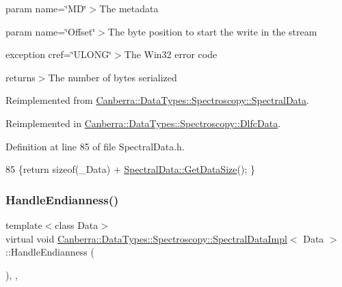 param name=\char`\"{}\+M\+D\char`\"{}$>$The metadata

param name=\char`\"{}\+Offset\char`\"{}$>$The byte position to start the write in the stream

exception cref=\char`\"{}\+U\+L\+O\+N\+G\char`\"{}$>$The Win32 error code

returns$>$The number of bytes serialized

Reimplemented from \hyperlink{class_canberra_1_1_data_types_1_1_spectroscopy_1_1_spectral_data_ac95bb6b9dd1b89c6c85b9a8afccd5d20_ac95bb6b9dd1b89c6c85b9a8afccd5d20}{Canberra\+::\+Data\+Types\+::\+Spectroscopy\+::\+Spectral\+Data}.



Reimplemented in \hyperlink{class_canberra_1_1_data_types_1_1_spectroscopy_1_1_dlfc_data_a4b0e2388fef2c2185e4bb2d94b431b11_a4b0e2388fef2c2185e4bb2d94b431b11}{Canberra\+::\+Data\+Types\+::\+Spectroscopy\+::\+Dlfc\+Data}.



Definition at line 85 of file Spectral\+Data.\+h.


\begin{DoxyCode}
85 \{\textcolor{keywordflow}{return} \textcolor{keyword}{sizeof}(\_Data) + \hyperlink{class_canberra_1_1_data_types_1_1_spectroscopy_1_1_spectral_data_ac95bb6b9dd1b89c6c85b9a8afccd5d20_ac95bb6b9dd1b89c6c85b9a8afccd5d20}{SpectralData::GetDataSize}(); \}
\end{DoxyCode}
\mbox{\label{class_canberra_1_1_data_types_1_1_spectroscopy_1_1_spectral_data_impl_add8a76fab9523229280ad47efb9b5bf0_add8a76fab9523229280ad47efb9b5bf0}} 
\subsubsection{\texorpdfstring{Handle\+Endianness()}{HandleEndianness()}}
{\footnotesize\ttfamily template$<$class Data$>$ \\
virtual void \hyperlink{class_canberra_1_1_data_types_1_1_spectroscopy_1_1_spectral_data_impl}{Canberra\+::\+Data\+Types\+::\+Spectroscopy\+::\+Spectral\+Data\+Impl}$<$ Data $>$\+::Handle\+Endianness (\begin{DoxyParamCaption}{ }\end{DoxyParamCaption})\hspace{0.3cm}{\ttfamily [inline]}, {\ttfamily [protected]}, {\ttfamily [virtual]}}

